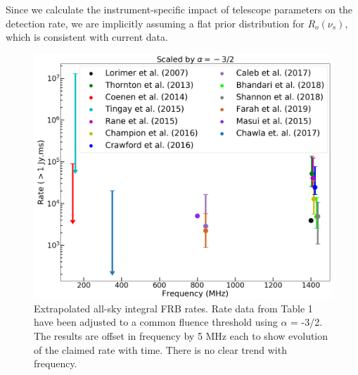 \documentclass[fleqn,usenatbib]{mnras}
\begin{document}
Since we calculate the instrument-specific impact of telescope parameters on the detection rate, we are implicitly assuming a flat prior distribution for $R_o(\nu_s)$, which is consistent with current data.  

\begin{figure}
 \includegraphics[width=\columnwidth]{frbrate_alpha15.png}
 \caption{ Extrapolated all-sky integral FRB rates. Rate data from Table 1 have been adjusted to a common fluence threshold using  $\alpha$ = -3/2. The results are offset in frequency by 5 MHz each to show evolution of the claimed rate with time. There is no clear trend with frequency.}
\end{figure}
\end{document}
